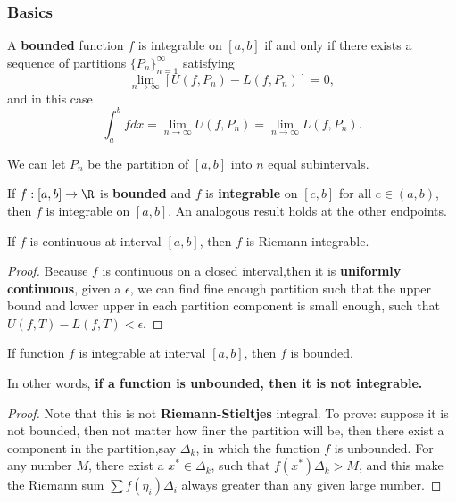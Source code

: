 \begin{refsection}
\subsubsection{Basics}

\begin{theorem}\cite[223]{abbott2001understanding}
A \textbf{bounded} function	$f$ is integrable on $[a,b]$ if and only if there exists a sequence of partitions $\{P_n\}_{n=1}^\infty$ satisfying
$$\lim_{n\to\infty} [U(f,P_n) - L(f,P_n)] = 0,$$
and in this case 
$$\int_a^b f dx = \lim_{n\to\infty} U(f,P_n)  = \lim_{n\to\infty}L(f,P_n).$$
\end{theorem}




\begin{remark}\cite[223]{abbott2001understanding}
We can let $P_n$ be the partition of $[a,b]$ into $n$ equal subintervals.	
\end{remark}



\begin{lemma}\cite[224]{abbott2001understanding} If $f:[a,b]\to\R$ is \textbf{bounded} and $f$ is \textbf{integrable} on $[c,b]$ for all $c\in(a,b)$, then $f$ is integrable on $[a,b]$. An analogous result holds at the other endpoints.
\end{lemma}


\begin{lemma}\cite{johnsonbaugh2010foundations}\cite[156]{fitzpatrick2006advanced}\cite[222]{abbott2001understanding}
	If $f$ is continuous at interval $[a,b]$, then $f$ is Riemann integrable. 
\end{lemma}
\begin{proof}
	Because $f$ is continuous on a closed interval,then it is \textbf{uniformly continuous}, given a $\epsilon$, we can find fine enough partition such that the upper bound and lower upper in each partition component is small enough, such that $U(f,T)-L(f,T)<\epsilon$.	
\end{proof}


\begin{lemma}\cite{mathanalysischinese} If function $f$ is integrable at interval $[a,b]$, then $f$ is bounded.

In other words, \textbf{if a function is unbounded, then it is not integrable.}
\end{lemma}
\begin{proof}
	Note that this is not \textbf{Riemann-Stieltjes} integral. To prove: suppose it is not bounded, then not matter how finer the partition will be, then there exist a component in the partition,say $\Delta_k$, in which the function $f$ is unbounded. For any number $M$, there exist a $x^*\in \Delta_k$, such that $f(x^*)\Delta_k > M$, and this make the Riemann sum $\sum f(\eta_i)\Delta_i$ always greater than any given large number.	
\end{proof}



\end{refsection}
